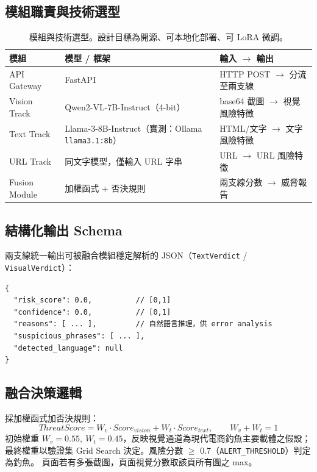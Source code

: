 \documentclass[11pt]{ctexart}
\begin{document}
\subsection{模組職責與技術選型}
\begin{table}[h]
\centering
\begin{tabular}{>{\raggedright\arraybackslash}p{3.2cm} >{\raggedright\arraybackslash}p{5cm} >{\raggedright\arraybackslash}p{5.5cm}}
\toprule
\textbf{模組} & \textbf{模型 / 框架} & \textbf{輸入 $\rightarrow$ 輸出} \\
\midrule
API Gateway & FastAPI & HTTP POST $\rightarrow$ 分流至兩支線 \\
Vision Track & Qwen2-VL-7B-Instruct（4-bit） & base64 截圖 $\rightarrow$ 視覺風險特徵 \\
Text Track & Llama-3-8B-Instruct（實測：Ollama \texttt{llama3.1:8b}） & HTML/文字 $\rightarrow$ 文字風險特徵 \\
URL Track & 同文字模型，僅輸入 URL 字串 & URL $\rightarrow$ URL 風險特徵 \\
Fusion Module & 加權函式 + 否決規則 & 兩支線分數 $\rightarrow$ 威脅報告 \\
\bottomrule
\end{tabular}
\caption{模組與技術選型。設計目標為開源、可本地化部署、可 LoRA 微調。}
\end{table}

\subsection{結構化輸出 Schema}
兩支線統一輸出可被融合模組穩定解析的 JSON（\texttt{TextVerdict} / \texttt{VisualVerdict}）：
\begin{lstlisting}
{
  "risk_score": 0.0,          // [0,1]
  "confidence": 0.0,          // [0,1]
  "reasons": [ ... ],         // 自然語言推理，供 error analysis
  "suspicious_phrases": [ ... ],
  "detected_language": null
}
\end{lstlisting}

\subsection{融合決策邏輯}
採加權函式加否決規則：
\begin{equation}
ThreatScore = W_v \cdot Score_{vision} + W_t \cdot Score_{text}, \qquad W_v + W_t = 1
\end{equation}
初始權重 $W_v=0.55,\ W_t=0.45$，反映視覺通道為現代電商釣魚主要載體之假設；
最終權重以驗證集 Grid Search 決定。風險分數 $\ge$ 0.7（\texttt{ALERT\_THRESHOLD}）判定為釣魚。
頁面若有多張截圖，頁面視覺分數取該頁所有圖之 max。
\end{document}
